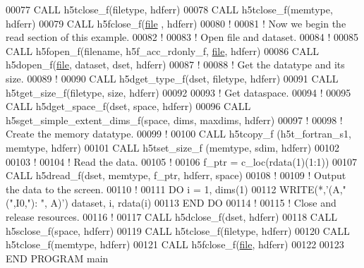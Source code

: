 \begin{DoxyCode}
00077   \textcolor{keyword}{CALL }h5tclose\_f(filetype, hdferr)
00078   \textcolor{keyword}{CALL }h5tclose\_f(memtype, hdferr)
00079   \textcolor{keyword}{CALL }h5fclose\_f(\hyperlink{structfile}{file} , hdferr)
00080   \textcolor{comment}{!}
00081   \textcolor{comment}{! Now we begin the read section of this example.}
00082   \textcolor{comment}{!}
00083   \textcolor{comment}{! Open file and dataset.}
00084   \textcolor{comment}{!}
00085   \textcolor{keyword}{CALL }h5fopen\_f(filename, h5f\_acc\_rdonly\_f, \hyperlink{structfile}{file}, hdferr)
00086   \textcolor{keyword}{CALL }h5dopen\_f(\hyperlink{structfile}{file}, dataset, dset, hdferr)
00087   \textcolor{comment}{!}
00088   \textcolor{comment}{! Get the datatype and its size.}
00089   \textcolor{comment}{!}
00090   \textcolor{keyword}{CALL }h5dget\_type\_f(dset, filetype, hdferr)
00091   \textcolor{keyword}{CALL }h5tget\_size\_f(filetype, \textcolor{keyword}{size}, hdferr)
00092 
00093   \textcolor{comment}{! Get dataspace.}
00094   \textcolor{comment}{!}
00095   \textcolor{keyword}{CALL }h5dget\_space\_f(dset, space, hdferr)
00096   \textcolor{keyword}{CALL }h5sget\_simple\_extent\_dims\_f(space, dims, maxdims, hdferr)
00097   \textcolor{comment}{!}
00098   \textcolor{comment}{! Create the memory datatype.}
00099   \textcolor{comment}{!}
00100   \textcolor{keyword}{CALL }h5tcopy\_f (h5t\_fortran\_s1, memtype, hdferr)
00101   \textcolor{keyword}{CALL }h5tset\_size\_f (memtype, sdim, hdferr)
00102 
00103   \textcolor{comment}{!}
00104   \textcolor{comment}{! Read the data.}
00105   \textcolor{comment}{!}
00106   f\_ptr = c\_loc(rdata(1)(1:1))
00107   \textcolor{keyword}{CALL }h5dread\_f(dset, memtype, f\_ptr, hdferr, space)
00108   \textcolor{comment}{!}
00109   \textcolor{comment}{! Output the data to the screen.}
00110   \textcolor{comment}{!}
00111   \textcolor{keywordflow}{DO} i = 1, dims(1)
00112      \textcolor{keyword}{WRITE}(*,\textcolor{stringliteral}{'(A,"(",I0,"): ", A)'}) dataset, i, rdata(i)
00113 \textcolor{keywordflow}{  END DO}
00114   \textcolor{comment}{!}
00115   \textcolor{comment}{! Close and release resources.}
00116   \textcolor{comment}{!}
00117   \textcolor{keyword}{CALL }h5dclose\_f(dset, hdferr)
00118   \textcolor{keyword}{CALL }h5sclose\_f(space, hdferr)
00119   \textcolor{keyword}{CALL }h5tclose\_f(filetype, hdferr)
00120   \textcolor{keyword}{CALL }h5tclose\_f(memtype, hdferr)
00121   \textcolor{keyword}{CALL }h5fclose\_f(\hyperlink{structfile}{file}, hdferr)
00122 
00123 \textcolor{keyword}{END PROGRAM }main
\end{DoxyCode}
